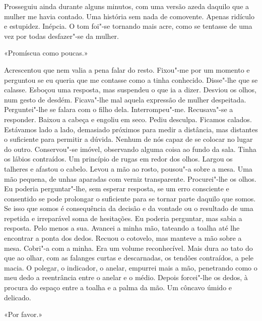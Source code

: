 Prosseguiu ainda durante alguns minutos, com uma versão azeda daquilo
que a mulher me havia contado. Uma história sem nada de comovente.
Apenas ridículo e estupidez. Inépcia. O tom foi"-se tornando mais acre,
como se tentasse de uma vez por todas desfazer"-se da mulher.

«Promíscua como poucas.»

Acrescentou que nem valia a pena falar do resto. Fixou"-me por um
momento e perguntou se eu queria que me contasse como a tinha conhecido.
Disse"-lhe que se calasse. Esboçou uma resposta, mas suspendeu o que ia
a dizer. Desviou os olhos, num gesto de desdém. Ficava"-lhe mal aquela
expressão de mulher despeitada. Perguntei"-lhe se falara com o filho
dela. Interrompeu"-me. Recusava"-se a responder. Baixou a cabeça e
engoliu em seco. Pediu desculpa. Ficamos calados. Estávamos lado a lado,
demasiado próximos para medir a distância, mas distantes o suficiente
para permitir a dúvida. Nenhum de nós capaz de se colocar no lugar do
outro. Conservou"-se imóvel, observando alguma coisa ao fundo da sala.
Tinha os lábios contraídos. Um princípio de rugas em redor dos olhos.
Largou os talheres e afastou o cabelo. Levou a mão ao rosto, pousou"-a
sobre a mesa. Uma mão pequena, de unhas aparadas com verniz
transparente. Procurei"-lhe os olhos. Eu poderia perguntar"-lhe, sem
esperar resposta, se um erro consciente e consentido se pode prolongar o
suficiente para se tornar parte daquilo que somos. Se isso que somos é
consequência da decisão e da vontade ou o resultado de uma repetida e
irreparável soma de hesitações. Eu poderia perguntar, mas sabia a
resposta. Pelo menos a sua. Avancei a minha mão, tateando a toalha até
lhe encontrar a ponta dos dedos. Recuou o cotovelo, mas manteve a mão
sobre a mesa. Cobri"-a com a minha. Era um volume reconhecível. Mais
dura ao tato do que ao olhar, com as falanges curtas e descarnadas, os
tendões contraídos, a pele macia. O polegar, o indicador, o anelar,
empurrei mais a mão, penetrando como o meu dedo a reentrância entre o
anelar e o médio. Depois forcei"-lhe os dedos, à procura do espaço entre
a toalha e a palma da mão. Um côncavo úmido e delicado.

«Por favor.»


